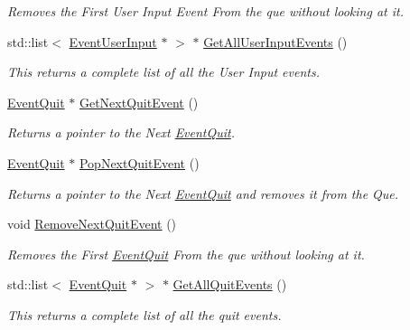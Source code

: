 \begin{DoxyCompactItemize}
\begin{DoxyCompactList}\small\item\em Removes the First User Input Event From the que without looking at it. \item\end{DoxyCompactList}\item 
std::list$<$ \hyperlink{classphys_1_1EventUserInput}{EventUserInput} $\ast$ $>$ $\ast$ \hyperlink{classphys_1_1EventManager_aef240dacae9479c4385d540e4feab867}{GetAllUserInputEvents} ()
\begin{DoxyCompactList}\small\item\em This returns a complete list of all the User Input events. \item\end{DoxyCompactList}\item 
\hyperlink{classphys_1_1EventQuit}{EventQuit} $\ast$ \hyperlink{classphys_1_1EventManager_ad7da09e5422b1db79ac4187ee9198d0c}{GetNextQuitEvent} ()
\begin{DoxyCompactList}\small\item\em Returns a pointer to the Next \hyperlink{classphys_1_1EventQuit}{EventQuit}. \item\end{DoxyCompactList}\item 
\hyperlink{classphys_1_1EventQuit}{EventQuit} $\ast$ \hyperlink{classphys_1_1EventManager_a9b0d8e4d76fef35423bb862d7127b747}{PopNextQuitEvent} ()
\begin{DoxyCompactList}\small\item\em Returns a pointer to the Next \hyperlink{classphys_1_1EventQuit}{EventQuit} and removes it from the Que. \item\end{DoxyCompactList}\item 
void \hyperlink{classphys_1_1EventManager_a5031871aa6e044764ec2963228f735dd}{RemoveNextQuitEvent} ()
\begin{DoxyCompactList}\small\item\em Removes the First \hyperlink{classphys_1_1EventQuit}{EventQuit} From the que without looking at it. \item\end{DoxyCompactList}\item 
std::list$<$ \hyperlink{classphys_1_1EventQuit}{EventQuit} $\ast$ $>$ $\ast$ \hyperlink{classphys_1_1EventManager_afefd52a9693bc5541592997abbf3c53f}{GetAllQuitEvents} ()
\begin{DoxyCompactList}\small\item\em This returns a complete list of all the quit events. \item\end{DoxyCompactList}\item 

\end{DoxyCompactItemize}

